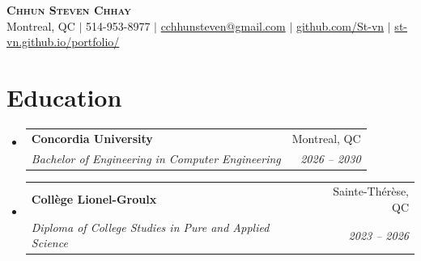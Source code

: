 \documentclass[letterpaper,11pt]{article}
\makeatletter
\newcommand{\resumeSubheading}[4]{
  \vspace{-2pt}\item
    \begin{tabular*}{0.97\textwidth}[t]{l@{\extracolsep{\fill}}r}
      \textbf{#1} & #2 \\
      \textit{\small#3} & \textit{\small #4} \\
    \end{tabular*}\vspace{-7pt}
}
\newcommand{\resumeSubHeadingListStart}{\begin{itemize}[leftmargin=0.15in, label={}]}
\newcommand{\resumeSubHeadingListEnd}{\end{itemize}}
\makeatother
\begin{document}
\begin{center}
    \textbf{\Huge \scshape Chhun Steven Chhay} \\ \vspace{1pt}
    \small Montreal, QC $|$ 514-953-8977 $|$ \href{mailto:cchhunsteven@gmail.com}{cchhunsteven@gmail.com} $|$ 
    \href{https://github.com/St-vn}{github.com/St-vn} $|$
    \href{https://st-vn.github.io/portfolio/}{st-vn.github.io/portfolio/}
\end{center}

\section{Education}
  \resumeSubHeadingListStart
    \resumeSubheading
      {Concordia University}{Montreal, QC}
      {Bachelor of Engineering in Computer Engineering}{2026 -- 2030}
    \resumeSubheading
      {Coll\`{e}ge Lionel-Groulx}{Sainte-Th\'{e}r\`{e}se, QC}
      {Diploma of College Studies in Pure and Applied Science}{2023 -- 2026}
  \resumeSubHeadingListEnd

\end{document}
